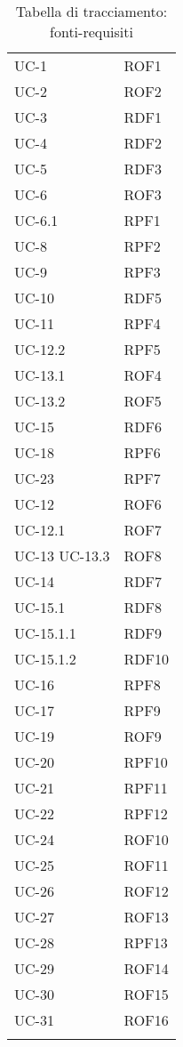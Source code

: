 \begin{longtable}{| p{5cm} | p{5cm} |}
		UC-1 & ROF1 \\
		\rowcolor{LightGray}
		UC-2 & ROF2 \\
		UC-3 & RDF1 \\
		\rowcolor{LightGray}
		UC-4 & RDF2 \\
		UC-5 & RDF3 \\
		\rowcolor{LightGray}
		UC-6 & ROF3 \\
		UC-6.1 & RPF1 \\
		\rowcolor{LightGray}
		UC-8 & RPF2 \\
		\rowcolor{LightGray}
		UC-9 & RPF3 \\
		UC-10 & RDF5 \\
		\rowcolor{LightGray}
		UC-11 & RPF4 \\
		UC-12.2 & RPF5 \\
		\rowcolor{LightGray}
		UC-13.1 & ROF4 \\
		UC-13.2 & ROF5 \\
		\rowcolor{LightGray}
		UC-15 & RDF6 \\
		UC-18 & RPF6 \\
		\rowcolor{LightGray}
		UC-23 & RPF7 \\
		UC-12 & ROF6 \\
		\rowcolor{LightGray}
		UC-12.1 &ROF7 \\
		UC-13 \newline UC-13.3 & ROF8 \\
		\rowcolor{LightGray}
		UC-14 & RDF7 \\
		UC-15.1 & RDF8 \\
		\rowcolor{LightGray}
		UC-15.1.1 & RDF9 \\
		UC-15.1.2 & RDF10\\
		\rowcolor{LightGray}
		UC-16 & RPF8 \\
		UC-17 & RPF9 \\
		\rowcolor{LightGray}
		UC-19 & ROF9 \\
		UC-20 & RPF10 \\
		\rowcolor{LightGray}
		UC-21 & RPF11 \\
		UC-22 & RPF12 \\ 
		\rowcolor{LightGray}
		UC-24 & ROF10 \\
		UC-25 & ROF11 \\
		\rowcolor{LightGray}
		UC-26 & ROF12 \\
		UC-27 & ROF13 \\
		\rowcolor{LightGray}
		UC-28 & RPF13 \\
		UC-29 & ROF14 \\
		\rowcolor{LightGray}
		UC-30 & ROF15 \\
		UC-31 & ROF16 \\
		\rowcolor{LightGray}
		\hline
		\caption{Tabella di tracciamento: fonti-requisiti}
\end{longtable}

